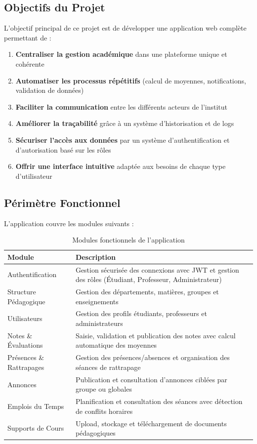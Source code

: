 \documentclass[12pt,a4paper]{report}
\begin{document}
\subsection{Objectifs du Projet}

L'objectif principal de ce projet est de développer une application web complète permettant de :

\begin{enumerate}[itemsep=0.5em]
    \item \textbf{Centraliser la gestion académique} dans une plateforme unique et cohérente
    \item \textbf{Automatiser les processus répétitifs} (calcul de moyennes, notifications, validation de données)
    \item \textbf{Faciliter la communication} entre les différents acteurs de l'institut
    \item \textbf{Améliorer la traçabilité} grâce à un système d'historisation et de logs
    \item \textbf{Sécuriser l'accès aux données} par un système d'authentification et d'autorisation basé sur les rôles
    \item \textbf{Offrir une interface intuitive} adaptée aux besoins de chaque type d'utilisateur
\end{enumerate}

\subsection{Périmètre Fonctionnel}

L'application couvre les modules suivants :

\begin{table}[H]
\centering
\caption{Modules fonctionnels de l'application}
\begin{tabular}{|p{4cm}|p{10cm}|}
\hline
\textbf{Module} & \textbf{Description} \\
\hline
Authentification & Gestion sécurisée des connexions avec JWT et gestion des rôles (Étudiant, Professeur, Administrateur) \\
\hline
Structure Pédagogique & Gestion des départements, matières, groupes et enseignements \\
\hline
Utilisateurs & Gestion des profils étudiants, professeurs et administrateurs \\
\hline
Notes \& Évaluations & Saisie, validation et publication des notes avec calcul automatique des moyennes \\
\hline
Présences \& Rattrapages & Gestion des présences/absences et organisation des séances de rattrapage \\
\hline
Annonces & Publication et consultation d'annonces ciblées par groupe ou globales \\
\hline
Emplois du Temps & Planification et consultation des séances avec détection de conflits horaires \\
\hline
Supports de Cours & Upload, stockage et téléchargement de documents pédagogiques \\
\hline
\end{tabular}
\end{table}
\end{document}
